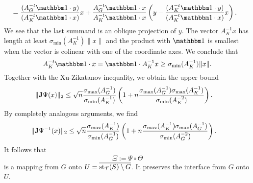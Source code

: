 \documentclass[10pt,a4paper]{article}
\begin{document}
\begin{itemize}
\begin{align*}
            \\&= 
            \frac{ 
                ( A_{{G}}^{-t} \vecone \cdot y ) 
            }{ 
                ( A_{K}^{-t} \vecone \cdot  x )
            } 
            x
            +
            \frac{ A_{{G}}^{-t} \vecone \cdot x }{ A_{K}^{-t} \vecone \cdot  x } 
            \left( 
                y
                -
                \frac{ 
                    ( A_{K}^{-t} \vecone \cdot y ) 
                }{ 
                    ( A_{K}^{-t} \vecone \cdot  x ) 
                } 
                x
            \right)
            .
        \end{align*}
        We see that the last summand is an oblique projection of $y$. 
        The vector $A_{K}^{-1} x$ has length at least $\sigma_{\min}( A_{K}^{-1} ) \| x \|$ and the product with $\vecone$ is smallest when the vector is colinear with one of the coordinate axes. We conclude that 
        \[
             A_{K}^{-t} \vecone \cdot x 
             = 
             \vecone \cdot A_{K}^{-1} x 
             \geq 
             \sigma_{\min}( A_{K}^{-1} ) \| x \|.
        \]
        Together with the Xu-Zikatanov inequality, we obtain the upper bound 
        \begin{align*}
            \|  {\mathbf{J}} \Psi(x)  \|_{2}
            &\leq 
            \sqrt{n}
            \frac{ \sigma_{\max}( A_{{G}}^{-1} ) }{ \sigma_{\min}( A_{K}^{-1} ) }
            \left( 
            1
            + 
            n
            \frac{ \sigma_{\max}( A_{{G}}^{-1} ) \sigma_{\max}( A_{K}^{-1} ) }{ \sigma_{\min}( A_{K}^{-2} ) }
            \right) 
            .
        \end{align*}
        By completely analogous arguments, we find 
        \begin{align*}
            \|  {\mathbf{J}} \Psi^{-1}(x)  \|_{2}
            &\leq 
            \sqrt{n}
            \frac{ \sigma_{\max}( A_{K}^{-1} ) }{ \sigma_{\min}( A_{{G}}^{-1} ) }
            \left( 
            1
            + 
            n
            \frac{ \sigma_{\max}( A_{K}^{-1} ) \sigma_{\max}( A_{{G}}^{-1} ) }{ \sigma_{\min}( A_{{G}}^{-2} ) }
            \right) 
            .
        \end{align*}
        It follows that 
        \begin{align*}
            \Xi := \Psi \circ \Theta
        \end{align*}
        is a mapping from ${G}$ onto $U = \overline{\operatorname{st}_{{\mathcal T}}(S) \setminus {G}}$.
        It preserves the interface from ${G}$ onto $U$. 
        

\end{itemize}
\end{document}
